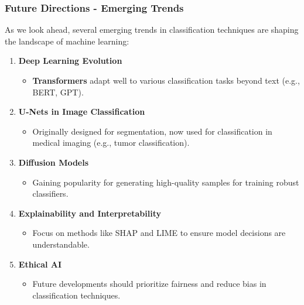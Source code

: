 \documentclass[aspectratio=169]{beamer}
\begin{document}
\begin{frame}[fragile]
    \frametitle{Future Directions - Emerging Trends}
    As we look ahead, several emerging trends in classification techniques are shaping the landscape of machine learning:
    
    \begin{enumerate}
        \item \textbf{Deep Learning Evolution}
            \begin{itemize}
                \item \textbf{Transformers} adapt well to various classification tasks beyond text (e.g., BERT, GPT).
            \end{itemize}
        \item \textbf{U-Nets in Image Classification}
            \begin{itemize}
                \item Originally designed for segmentation, now used for classification in medical imaging (e.g., tumor classification).
            \end{itemize}
        \item \textbf{Diffusion Models}
            \begin{itemize}
                \item Gaining popularity for generating high-quality samples for training robust classifiers.
            \end{itemize}
        \item \textbf{Explainability and Interpretability}
            \begin{itemize}
                \item Focus on methods like SHAP and LIME to ensure model decisions are understandable.
            \end{itemize}
        \item \textbf{Ethical AI}
            \begin{itemize}
                \item Future developments should prioritize fairness and reduce bias in classification techniques.
            \end{itemize}
    \end{enumerate}
\end{frame}
\end{document}
